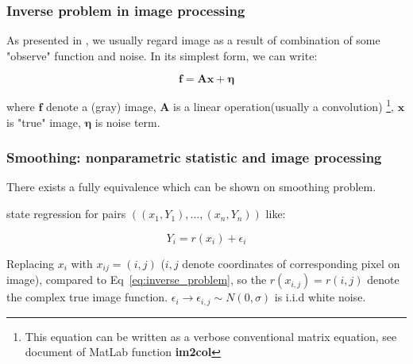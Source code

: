 \documentclass{beamer}
\begin{document}
\begin{frame}

    \frametitle{Inverse problem in image processing}
    As presented in \cite{dong2015image}, we usually regard image as a result of combination of some "observe"
    function and noise. In its simplest form, we can write:
    
    \begin{equation}
    \mathbf{f} = \mathbf{A} \mathbf{x} + \mathbf{\eta}
    \label{eq:inverse_problem}
    \end{equation}
    
    where $\mathbf{f}$ denote a (gray) image, $\mathbf{A}$ is a linear operation(usually a convolution)
    \footnote{This equation can be written as a verbose conventional matrix equation, 
    see document of MatLab function \bf{im2col}}, 
    $\mathbf{x}$ is "true" image, $\mathbf{\eta}$ is noise term.
    

\end{frame}

\begin{frame}

    \frametitle{Smoothing: nonparametric statistic and image processing}

    There exists a fully equivalence which can be shown on smoothing problem.

    \cite{wasserman2006all} state regression for pairs $((x_1,Y_1),\dots,(x_n,Y_n))$ like:
    
    $$
    Y_i = r(x_i) + \epsilon_i
    $$
    
    Replacing $x_i$ with $x_{ij}=(i,j)$ ($i,j$ denote coordinates of corresponding pixel on image), compared to Eq~\ref{eq:inverse_problem},
    so the $r(x_{i,j})=r(i,j)$ denote the complex true image function. $\epsilon_i \to \epsilon_{i,j} \sim N(0,\sigma)$ is i.i.d white noise.
    
    

\end{frame}
\end{document}
